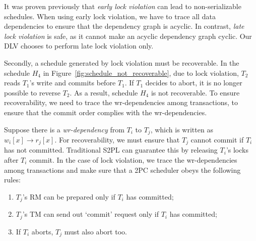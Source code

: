 \documentclass[conference]{IEEEtran}
\begin{document}
It was proven previously that \emph{early lock violation} can lead to non-serializable schedules.
When using early lock violation, we have to trace all data dependencies to ensure that the dependency graph is acyclic.
In contrast, \emph{late lock violation} is safe, as it cannot make an acyclic dependency graph cyclic.
Our DLV chooses to perform late lock violation only.



Secondly, a schedule generated by lock violation must be recoverable.
In the schedule ${H_4}$ in Figure~\ref{fig:schedule_not_recoverable}, due to lock violation,
${T_2}$ reads  ${T_1}$'s write and commits before ${T_1}$.
If ${T_1}$ decides to abort, it is no longer possible to reverse ${T_2}$.
As a result, schedule ${H_4}$ is not recoverable.
To ensure recoverability, we need to trace the wr-dependencies among transactions, to ensure that the commit order complies with the wr-dependencies.





Suppose there is a \emph{wr-dependency} from ${T_i}$ to ${T_j}$,
which is written as ${w_i[x] \rightarrow r_j[x]}$.
For recoverability, we must ensure that ${T_j}$ cannot commit if ${T_i}$ has not committed.
Traditional S2PL can guarantee this by releasing ${T_i}$'s locks after ${T_i}$ commit.
In the case of lock violation, we trace the wr-dependencies among transactions and make sure that a 2PC scheduler obeys the following rules:
\begin{enumerate}
  \item ${T_j}$'s RM can be prepared only if ${T_i}$ has committed;
  \label{rule:prepare}

  \item ${T_j}$'s TM can send out `commit' request only if ${T_i}$ has committed;
  \label{rule:commit}

  \item If ${T_i}$ aborts, ${T_j}$ must also abort too.
  \label{rule:abort}
\end{enumerate}
\end{document}

